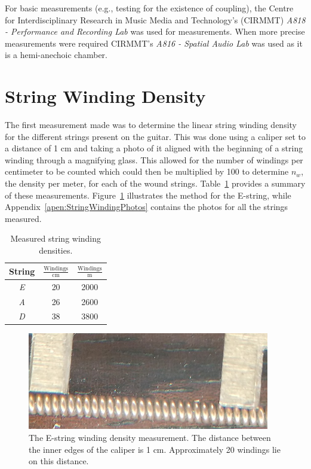 \documentclass[../main.tex]{subfiles}
\begin{document}
For basic measurements (e.g., testing for the existence of coupling), the Centre for Interdisciplinary Research in Music Media and Technology's (CIRMMT) \emph{A818 - Performance and Recording Lab} was used for measurements. When more precise measurements were required CIRMMT's \emph{A816 - Spatial Audio Lab} was used as it is a hemi-anechoic chamber.

\section{String Winding Density}
The first measurement made was to determine the linear string winding density for the different strings present on the guitar. This was done using a caliper set to a distance of 1 cm and taking a photo of it aligned with the beginning of a string winding through a magnifying glass. This allowed for the number of windings per centimeter to be counted which could then be multiplied by 100 to determine $n_w$, the density per meter, for each of the wound strings. Table~\ref{tab:WindingDensities} provides a summary of these measurements. Figure~\ref{fig:EWindings} illustrates the method for the E-string, while Appendix~\ref{apen:StringWindingPhotos} contains the photos for all the strings measured.

\begin{table}[h]
\centering
    \begin{tabular}{||c|| c| c||} 
        \hline
        String & $\frac{\text{Windings}}{\text{cm}}$ & $\frac{\text{Windings}}{\text{m}}$ \\ [0.5ex] 
        \hline
        \hline
        \emph{E} & 20 & 2000 \\ 
        \hline
        \emph{A} & 26 & 2600 \\
        \hline
        \emph{D} & 38 & 3800 \\ 
        \hline
    \end{tabular}
\caption{Measured string winding densities.}
\label{tab:WindingDensities}
\end{table}

\begin{figure}[h]
    \centering
    \includegraphics[scale=1]{./images/pictures/WindingsEZoom.png}
    \caption{The E-string winding density measurement. The distance between the inner edges of the caliper is 1 cm. Approximately 20 windings lie on this distance.}
    \label{fig:EWindings}
\end{figure}
\end{document}
